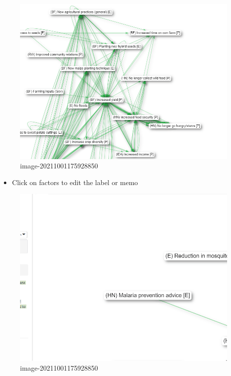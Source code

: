 \documentclass[
]{book}
\providecommand{\tightlist}{%
  \setlength{\itemsep}{0pt}\setlength{\parskip}{0pt}}
\begin{document}
\begin{figure}
\centering
\includegraphics[width=6.77083in,height=\textheight]{_assets/focus.gif}
\caption{image-20211001175928850}
\end{figure}

\begin{itemize}
\tightlist
\item
  Click on factors to edit the label or memo
\end{itemize}

\begin{figure}
\centering
\includegraphics[width=6.77083in,height=\textheight]{_assets/edit.gif}
\caption{image-20211001175928850}
\end{figure}
\end{document}
